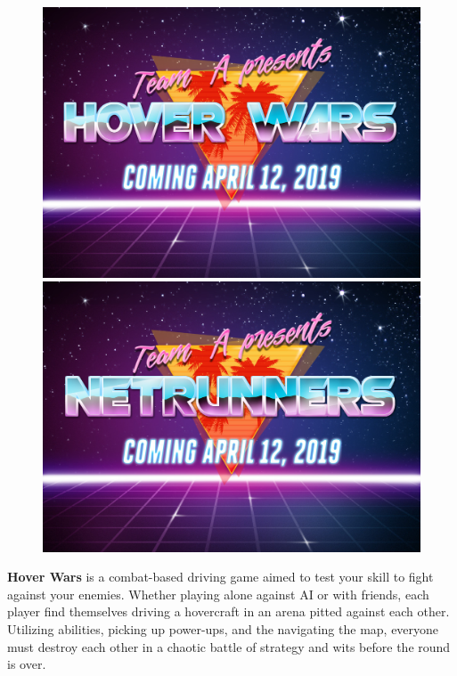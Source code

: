 \documentclass{article}
\newcommand{\namenobold}{Hover Wars}
\newcommand{\name}{\textbf{\namenobold}}
\theoremstyle{definition}
\begin{document}
\begin{figure}[htpb]
  \centering
  \includegraphics[width=1.0\linewidth]{title_art_hover_wars.jpg}
  \includegraphics[width=1.0\linewidth]{title_art_netrunners.jpg}
\label{fig:title_art}
\end{figure}


\name{} is a combat-based driving game aimed to test your skill to fight
against your enemies. Whether playing alone against AI or with friends, each
player find themselves driving a hovercraft in an arena pitted against each
other. Utilizing abilities, picking up power-ups, and the navigating the map,
everyone must destroy each other in a chaotic battle of strategy and wits
before the round is over.
\end{document}
